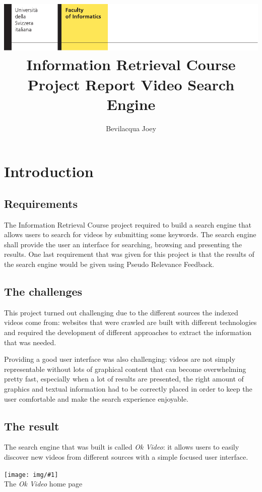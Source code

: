 \documentclass[12pt]{exam}
\title{
{\protect\includegraphics[width=\textwidth]{logo-info.pdf}}
\protect\textbf{Information Retrieval Course Project Report}\n
\protect Video Search Engine
}
\author{Bevilacqua Joey}
\newcommand{\pic}[2]{{
\begin{center}
\texttt{[image: img/\#1]} \\
{#2}
\end{center}
}}
\begin{document}
\maketitle

\tableofcontents

\newpage

\section{Introduction}

\subsection{Requirements}

The Information Retrieval Course project required to build a search engine
that allows users to search for videos by submitting some keywords. 
The search engine shall provide the user an interface for searching, browsing
and presenting the results. One last requirement that was given for this
project is that the results of the search engine would be given using
Pseudo Relevance Feedback.

\subsection{The challenges}

This project turned out challenging due to the different sources the
indexed videos come from: websites that were crawled are built with different
technologies and required the development of different approaches to extract
the information that was needed.

Providing a good user interface was also challenging: videos are not simply
representable without lots of graphical content that can become overwhelming
pretty fast, especially when a lot of results are presented, the right amount
of graphics and textual information had to be correctly placed in order to
keep the user comfortable and make the search experience enjoyable.

\subsection{The result}

The search engine that was built is called \textit{Ok Video}: it allows
users to easily discover new videos from different sources with a simple
focused user interface.

\pic{se_home}{The \textit{Ok Video} home page}
\end{document}
